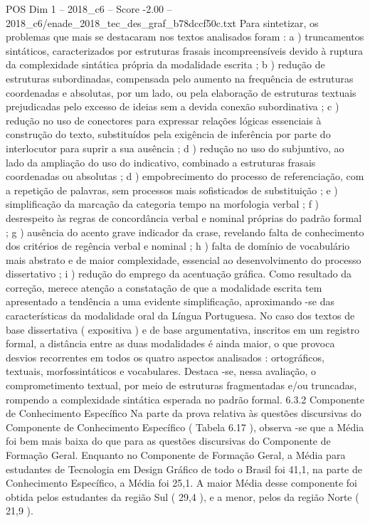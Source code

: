 \begin{textsample}{POS Dim 1 – 2018\_c6 – Score -2.00 – 2018\_c6/enade\_2018\_tec\_des\_graf\_b78dccf50c.txt}
Para sintetizar, os problemas que mais se destacaram nos textos analisados foram : a ) truncamentos sintáticos, caracterizados por estruturas frasais incompreensíveis devido à ruptura da complexidade sintática própria da modalidade escrita ; b ) redução de estruturas subordinadas, compensada pelo aumento na frequência de estruturas coordenadas e absolutas, por um lado, ou pela elaboração de estruturas textuais prejudicadas pelo excesso de ideias sem a devida conexão subordinativa ; c ) redução no uso de conectores para expressar relações lógicas essenciais à construção do texto, substituídos pela exigência de inferência por parte do interlocutor para suprir a sua ausência ; d ) redução no uso do subjuntivo, ao lado da ampliação do uso do indicativo, combinado a estruturas frasais coordenadas ou absolutas ; d ) empobrecimento do processo de referenciação, com a repetição de palavras, sem processos mais sofisticados de substituição ; e ) simplificação da marcação da categoria tempo na morfologia verbal ; f ) desrespeito às regras de concordância verbal e nominal próprias do padrão formal ; g ) ausência do acento grave indicador da crase, revelando falta de conhecimento dos critérios de regência verbal e nominal ; h ) falta de domínio de vocabulário mais abstrato e de maior complexidade, essencial ao desenvolvimento do processo dissertativo ; i ) redução do emprego da acentuação gráfica.
Como resultado da correção, merece atenção a constatação de que a modalidade escrita tem apresentado a tendência a uma evidente simplificação, aproximando -se das características da modalidade oral da Língua Portuguesa.
No caso dos textos de base dissertativa ( expositiva ) e de base argumentativa, inscritos em um registro formal, a distância entre as duas modalidades é ainda maior, o que provoca desvios recorrentes em todos os quatro aspectos analisados : ortográficos, textuais, morfossintáticos e vocabulares.
Destaca -se, nessa avaliação, o comprometimento textual, por meio de estruturas fragmentadas e/ou truncadas, rompendo a complexidade sintática esperada no padrão formal. 6.3.2 Componente de Conhecimento Específico Na parte da prova relativa às questões discursivas do Componente de Conhecimento Específico ( Tabela 6.17 ), observa -se que a Média foi bem mais baixa do que para as questões discursivas do Componente de Formação Geral.
Enquanto no Componente de Formação Geral, a Média para estudantes de Tecnologia em Design Gráfico de todo o Brasil foi 41,1, na parte de Conhecimento Específico, a Média foi 25,1.
A maior Média desse componente foi obtida pelos estudantes da região Sul ( 29,4 ), e a menor, pelos da região Norte ( 21,9 ).

\end{textsample}
